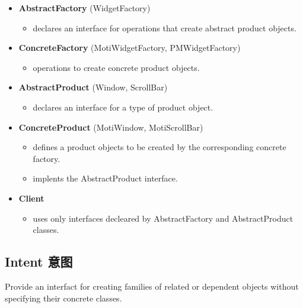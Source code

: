 \begin{itemize}
\small
\item \textbf{AbstractFactory} (WidgetFactory)

	\begin{itemize}
		\item declares an interface for operations that create abstract product objects.
	\end{itemize}

\item \textbf{ConcreteFactory} (MotiWidgetFactory, PMWidgetFactory)
	
	\begin{itemize}
		\item  operations to create concrete product objects.
	\end{itemize}

\item \textbf{AbstractProduct} (Window, ScrollBar)

	\begin{itemize}
		\item declares an interface for a type of product object.
	\end{itemize}

\item \textbf{ConcreteProduct} (MotiWindow, MotiScrollBar)

	\begin{itemize}
		\item defines a product objects to be created by the corresponding concrete factory.

		\item implents the AbstractProduct interface.
	\end{itemize}

\item \textbf{Client} 

	\begin{itemize}
		\item  uses only interfaces decleared by AbstractFactory and AbstractProduct classes.
	\end{itemize}
\normalize
\end{itemize}

\subsection{Intent 意图} 

Provide an interfact for creating families of related or dependent objects without specifying their concrete classes.

